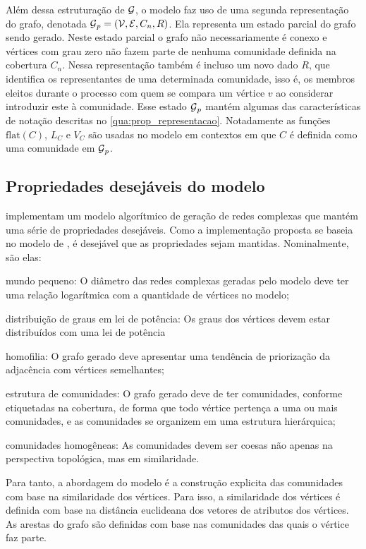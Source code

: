 \documentclass[notes.tex]{subfiles}
\begin{document}
Além dessa estruturação de $\operatorname{\mathcal{G}}$, o modelo faz uso de uma segunda representação do grafo, denotada  $\operatorname{\mathcal{G}}_p = (\operatorname{\mathcal{V}}, \operatorname{\mathcal{E}}, C_n, R)$.
Ela representa um estado parcial do grafo sendo gerado.
Neste estado parcial o grafo não necessariamente é conexo e vértices com grau zero não fazem parte de nenhuma comunidade definida na cobertura $C_n$.
Nessa representação também é incluso um novo dado $R$, que identifica os representantes de uma determinada comunidade, isso é, os membros eleitos durante o processo com quem se compara um vértice $v$ ao considerar introduzir este à comunidade.
Esse estado $\operatorname{\mathcal{G}}_p$ mantém algumas das características de notação descritas no \autoref{qua:prop_representacao}.
Notadamente as funções $\text{flat}(C)$, $L_C$ e $V_C$ são usadas no modelo em contextos em que  $C$ é definida como uma comunidade em $\operatorname{\mathcal{G}}_p$.

\subsection{Propriedades desejáveis do modelo}

 implementam um modelo algorítmico de geração de redes complexas que mantém uma série de propriedades desejáveis.
Como a implementação proposta se baseia no modelo de , é desejável que as propriedades sejam mantidas.
Nominalmente, são elas:

\begin{alineas}
    \item mundo pequeno: O diâmetro das redes complexas geradas pelo modelo deve ter uma relação logarítmica com a quantidade de vértices no modelo;
    \item distribuição de graus em lei de potência: Os graus dos vértices devem estar distribuídos com uma lei de potência
    \item homofilia: O grafo gerado deve apresentar uma tendência de priorização da adjacência com vértices semelhantes;
    \item estrutura de comunidades: O grafo gerado deve de ter comunidades, conforme etiquetadas na cobertura, de forma que todo vértice pertença a uma ou mais comunidades, e as comunidades se organizem em uma estrutura hierárquica;
    \item comunidades homogêneas: As comunidades devem ser coesas não apenas na perspectiva topológica, mas em similaridade.
\end{alineas}

Para tanto, a abordagem do modelo é a construção explicita das comunidades com base na similaridade dos vértices.
Para isso, a similaridade dos vértices é definida com base na distância euclideana dos vetores de atributos dos vértices.
As arestas do grafo são definidas com base nas comunidades das quais o vértice faz parte.
\end{document}
